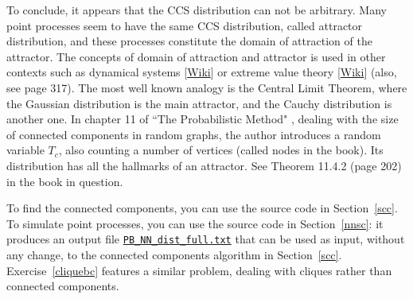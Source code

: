 \documentclass[10pt]{article}
\begin{document}
\begin{Exercise}
To conclude, it appears that the CCS distribution can not be arbitrary. Many point processes seem to have the same CCS distribution, called \textcolor{index}{attractor distribution},  and these processes constitute the 
\textcolor{index}{domain of attraction} of the attractor. The concepts of domain of attraction and attractor is used in other contexts such as \textcolor{index}{dynamical systems} [\href{https://en.wikipedia.org/wiki/Attractor}{Wiki}] or extreme value theory [\href{https://en.wikipedia.org/wiki/Generalized_extreme_value_distribution}{Wiki}] (also, see \cite{order2} page 317). The most well known analogy is the \textcolor{index}{Central Limit Theorem}, where the Gaussian distribution is the main attractor, and the Cauchy distribution is another one. In chapter 11 of ``The Probabilistic Method"  \cite{probme}, 
dealing with the size of connected components in random graphs, the author introduces a random variable $T_c$, also counting a number of vertices 
(called \textcolor{index}{nodes} in the book). Its distribution has all the hallmarks of an attractor. See  Theorem 11.4.2 (page 202) in the book in question.

To find the connected components, you can use the source code in Section~\ref{scc}. To simulate point processes, you can use the source code
 in Section~\ref{nnsc}: it produces an output file 
\href{https://github.com/VincentGranville/Point-Processes/blob/main/Data/PB_NN_dist_full.txt}{\texttt{PB\_NN\_dist\_full.txt}}  
that can be used as input, without any change, to the connected components algorithm in Section~\ref{scc}.  Exercise~\ref{cliquebc} features a similar problem, dealing with cliques
 rather than connected components.
\end{Exercise}
\end{document}
